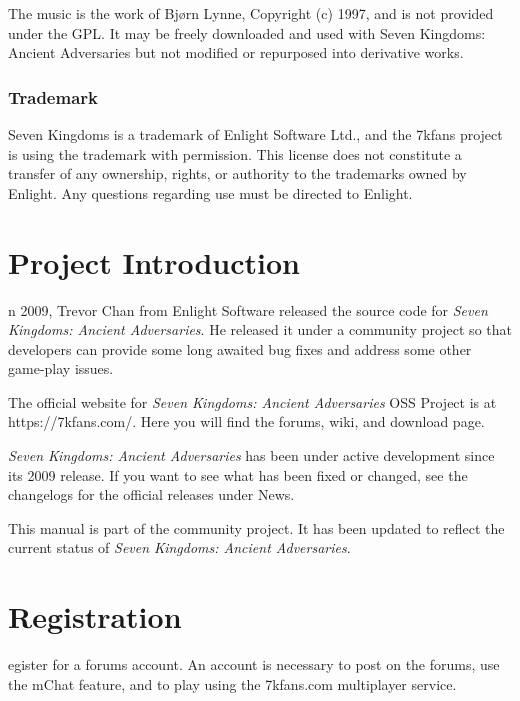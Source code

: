 \documentclass[openany]{book}
\begin{document}

The music is the work of Bjørn Lynne, Copyright (c) 1997, and is not provided under the GPL. It may be freely downloaded and used with Seven Kingdoms: Ancient Adversaries but not modified or repurposed into derivative works.

\subsubsection*{Trademark}

Seven Kingdoms is a trademark of Enlight Software Ltd., and the 7kfans project is using the trademark with permission. This license does not constitute a transfer of any ownership, rights, or authority to the trademarks owned by Enlight. Any questions regarding use must be directed to Enlight.

\clearpage

\section*{Project Introduction}


n 2009, Trevor Chan from Enlight Software released the source code for \textit{Seven Kingdoms: Ancient Adversaries}. He released it under a community project so that developers can provide some long awaited bug fixes and address some other game-play issues. 

The official website for \textit{Seven Kingdoms: Ancient Adversaries} OSS Project is at https://7kfans.com/. Here you will find the forums, wiki, and download page.

\textit{Seven Kingdoms: Ancient Adversaries} has been under active development since its 2009 release. If you want to see what has been fixed or changed, see the changelogs for the official releases under News. 

This manual is part of the community project. It has been updated to reflect the current status of \textit{Seven Kingdoms: Ancient Adversaries}.


\section*{Registration}


egister for a forums account. An account is necessary to post on the forums, use the mChat feature, and to play using the 7kfans.com multiplayer service.
\end{document}
